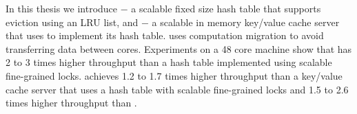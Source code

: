 
In this thesis we introduce \cphash{} $-$ a scalable fixed size hash table that supports eviction
using an LRU list, and \cpserver{} $-$ a scalable in memory key/value cache server that uses \cphash{} 
to implement its hash table. \cphash{} uses computation migration to avoid transferring data between cores. 
Experiments on a 48 core machine show that \cphash{} has 2 to 3 times higher throughput than a hash
table implemented using scalable fine-grained locks. \cpserver{} achieves
1.2 to 1.7 times higher throughput than a key/value cache server that uses a hash table with
scalable fine-grained locks and 1.5 to 2.6 times higher throughput than \memcached{}.
